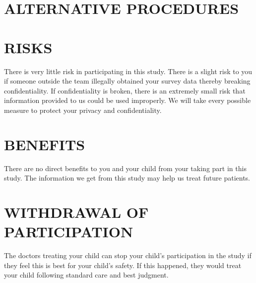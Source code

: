 \documentclass[11pt]{article}
\begin{document}
%
{%
\section{ALTERNATIVE PROCEDURES}
\label{sec:alternativeprocedures}
{}
}%
{}%

%
{%
\section{RISKS}
\label{sec:risks}
{There is very little risk in participating in this study.  There is a slight risk to you if someone outside the team illegally obtained your survey data thereby breaking confidentiality.  If confidentiality is broken, there is an extremely small risk that information provided to us could be used improperly.  We will take every possible measure to protect your privacy and confidentiality.}
}%
{}%

%
{%
\section{BENEFITS}
\label{sec:benefits}
{There are no direct benefits to you and your child from your taking part in this study. The information we get from this study may help us treat future patients.}
}%
{}%

%
{%
\section{WITHDRAWAL OF PARTICIPATION}
\label{sec:righttowithdraw}
{The doctors treating your child can stop your child's participation in the study if they feel this is best for your child's safety. If this happened, they would treat your child following standard care and best judgment.}
}%
{}%
\end{document}
